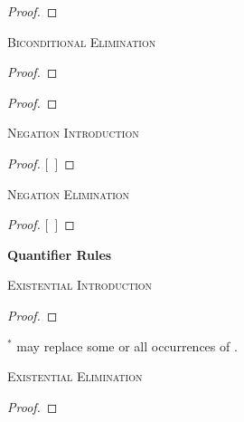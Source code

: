 \begin{proof}
	 
\end{proof}

\textsc{Biconditional Elimination}

\begin{proof}
	 
\end{proof}

\begin{proof}
	 
\end{proof}



\textsc{Negation Introduction}

\begin{proof}
\open
	\metaA{}
	\metaB{}
\close
{}[\ ]{\enot\metaA{}}
\end{proof}

\textsc{Negation Elimination}

\begin{proof}
\open
	\metaB{}
\close
{}[\ ]\metaA{}
\end{proof}






\newpage

{\Large \bf Quantifier Rules}

\textsc{Existential Introduction}

\begin{proof}
	 
\end{proof}

$^\ast$  may replace some or all occurrences of .



\textsc{Existential Elimination}

\begin{proof}
	\open	
	\close
	 
\end{proof}

